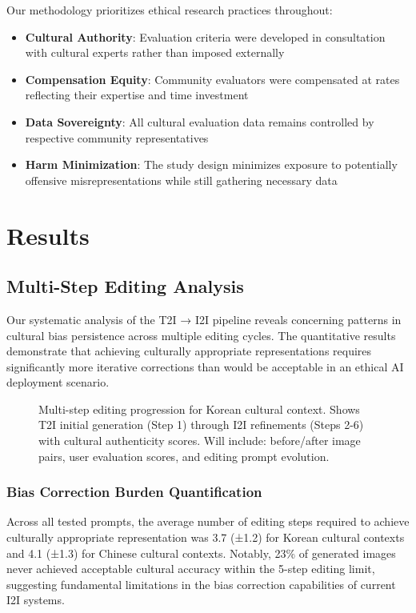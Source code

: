 \documentclass{article}
\begin{document}
Our methodology prioritizes ethical research practices throughout:

\begin{itemize}
\item \textbf{Cultural Authority}: Evaluation criteria were developed in consultation with cultural experts rather than imposed externally
\item \textbf{Compensation Equity}: Community evaluators were compensated at rates reflecting their expertise and time investment
\item \textbf{Data Sovereignty}: All cultural evaluation data remains controlled by respective community representatives
\item \textbf{Harm Minimization}: The study design minimizes exposure to potentially offensive misrepresentations while still gathering necessary data
\end{itemize}

\section{Results}

\subsection{Multi-Step Editing Analysis}

Our systematic analysis of the T2I → I2I pipeline reveals concerning patterns in cultural bias persistence across multiple editing cycles. The quantitative results demonstrate that achieving culturally appropriate representations requires significantly more iterative corrections than would be acceptable in an ethical AI deployment scenario.

\begin{figure}[h]
  \centering
  \fbox{\rule[-.5cm]{0cm}{6cm} \rule[-.5cm]{12cm}{0cm}}
  \caption{Multi-step editing progression for Korean cultural context. Shows T2I initial generation (Step 1) through I2I refinements (Steps 2-6) with cultural authenticity scores. Will include: before/after image pairs, user evaluation scores, and editing prompt evolution.}
  \label{fig:korean-editing-steps}
\end{figure}

\subsubsection{Bias Correction Burden Quantification}

Across all tested prompts, the average number of editing steps required to achieve culturally appropriate representation was 3.7 (±1.2) for Korean cultural contexts and 4.1 (±1.3) for Chinese cultural contexts. Notably, 23\% of generated images never achieved acceptable cultural accuracy within the 5-step editing limit, suggesting fundamental limitations in the bias correction capabilities of current I2I systems.
\end{document}
